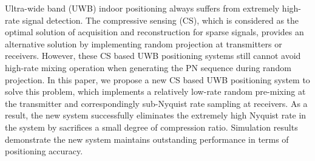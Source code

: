 Ultra-wide band (UWB) indoor positioning always suffers from extremely high-rate signal detection. The compressive sensing (CS), which is considered as the optimal solution of acquisition and reconstruction for sparse signals, provides an alternative solution by implementing random projection at transmitters or receivers. However, these CS based UWB positioning systems still cannot avoid high-rate mixing operation when generating the PN sequence during random projection. In this paper, we propose a new CS based UWB positioning system to solve this problem, which implements a relatively low-rate random pre-mixing at the transmitter and correspondingly sub-Nyquist rate sampling at receivers. As a result, the new system successfully eliminates the extremely high Nyquist rate in the system by sacrifices a small degree of compression ratio. Simulation results demonstrate the new system maintains outstanding performance in terms of positioning accuracy. 
